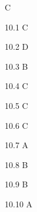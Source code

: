 \begin{Solution}{10}
C
\end{Solution}
\begin{Solution}{10.{1}}
C
\end{Solution}
\begin{Solution}{10.{2}}
D
\end{Solution}
\begin{Solution}{10.{3}}
B
\end{Solution}
\begin{Solution}{10.{4}}
C
\end{Solution}
\begin{Solution}{10.{5}}
C
\end{Solution}
\begin{Solution}{10.{6}}
C
\end{Solution}
\begin{Solution}{10.{7}}
A
\end{Solution}
\begin{Solution}{10.{8}}
B
\end{Solution}
\begin{Solution}{10.{9}}
B
\end{Solution}
\begin{Solution}{10.{10}}
A
\end{Solution}
